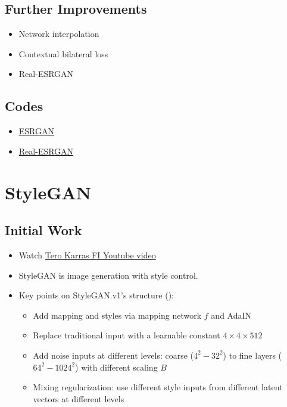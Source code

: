 \subsection{Further Improvements}
\begin{itemize}
	\item Network interpolation \cite{wang2018esrgan, wang2019deep}
	\item Contextual bilateral loss \cite{zhang2019zoom}
	\item Real-\ac{ESRGAN} \cite{wang2021realesrgan}
\end{itemize}

\subsection{Codes}
\begin{itemize}
	\item \href{https://github.com/xinntao/ESRGAN}{\ac{ESRGAN}} \cite{wang2018esrgan}
	\item \href{https://github.com/xinntao/Real-ESRGAN}{Real-\ac{ESRGAN}} \cite{wang2021realesrgan}
\end{itemize}

\section{StyleGAN}
\subsection{Initial Work}
\begin{itemize}
	\item Watch \href{https://youtu.be/kSLJriaOumA}{Tero Karras FI Youtube video}
	\item StyleGAN is image generation with style control. \cite{karras2019style}
	\item Key points on StyleGAN.v1's structure ():
	\begin{itemize}
		\item Add mapping and styles via mapping network $f$ and \ac{AdaIN}
		\item Replace traditional input with a learnable constant \texttt{$4 \times 4 \times 512$}
		\item Add noise inputs at different levels: coarse ($4^2-32^2$) to fine layers ($64^2-1024^2$) with different scaling $B$
		\item Mixing regularization: use different style inputs from different latent vectors at different levels
	\end{itemize}
\end{itemize}

